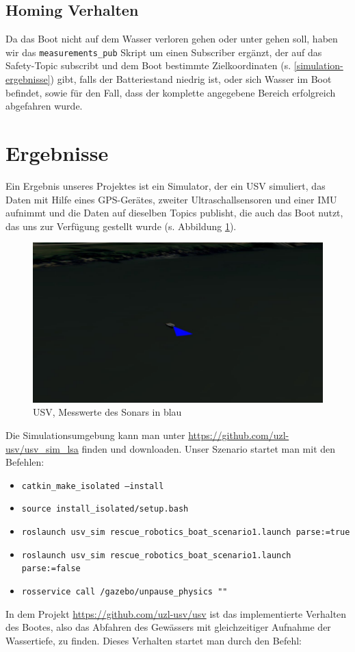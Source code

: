 \documentclass[11pt]{article}
\begin{document}
\subsection{Homing Verhalten}
Da das Boot nicht auf dem Wasser verloren gehen oder unter gehen soll, haben wir das \texttt{measurements\_pub} Skript um einen Subscriber ergänzt, der auf das Safety-Topic subscribt und dem Boot bestimmte Zielkoordinaten (s. \ref{simulation-ergebnisse}) gibt, falls der Batteriestand niedrig ist, oder sich Wasser im Boot befindet, sowie für den Fall, dass der komplette angegebene Bereich erfolgreich abgefahren wurde.

\section{Ergebnisse}

Ein Ergebnis unseres Projektes ist ein Simulator, der ein USV simuliert, das Daten mit Hilfe eines GPS-Gerätes, zweiter Ultraschallsensoren und einer IMU aufnimmt und die Daten auf dieselben Topics publisht, die auch das Boot nutzt, das uns zur Verfügung gestellt wurde (s. Abbildung \ref{sonar}).

\begin{figure}[h]
	\centering
	\includegraphics[width=0.8\linewidth]{sonar_boot.jpg}
	\caption{USV, Messwerte des Sonars in blau}
	\label{sonar}
\end{figure}

Die Simulationsumgebung kann man unter \url{https://github.com/uzl-usv/usv_sim_lsa} finden und downloaden. Unser Szenario startet man mit den Befehlen:
\begin{itemize}
	\item \texttt{catkin\_make\_isolated --install}
	\item \texttt{source install\_isolated/setup.bash}
	\item \texttt{roslaunch usv\_sim rescue\_robotics\_boat\_scenario1.launch parse:=true}
	\item \texttt{roslaunch usv\_sim rescue\_robotics\_boat\_scenario1.launch parse:=false}
	\item \texttt{rosservice call /gazebo/unpause\_physics "{}"}
\end{itemize}
In dem Projekt \url{https://github.com/uzl-usv/usv} ist das implementierte Verhalten des Bootes, also das Abfahren des Gewässers mit gleichzeitiger Aufnahme der Wassertiefe, zu finden. Dieses Verhalten startet man durch den Befehl:
\end{document}
